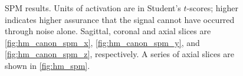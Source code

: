 \begin{figure}[H]
\centering
{}
\caption{SPM results. Units of activation are in Student's $t$-scores; higher indicates higher
        assurance that the signal cannot have occurred through noise alone.
        Sagittal, coronal and axial slices  are
        \autoref{fig:hm_canon_spm_x}, \autoref{fig:hm_canon_spm_y}, and
         \autoref{fig:hm_canon_spm_z}, respectively. A series of axial slices are
         shown in \autoref{fig:hm_spm}. }
\label{fig:hm_canon_spm}
\end{figure}

